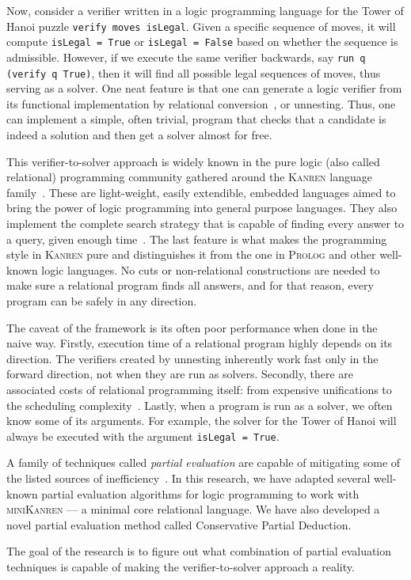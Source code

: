 Now, consider a verifier written in a logic programming language for the Tower of Hanoi puzzle \texttt{verify moves isLegal}. 
Given a specific sequence of moves, it will compute \texttt{isLegal = True} or \texttt{isLegal = False} based on whether the sequence is admissible. 
However, if we execute the same verifier backwards, say \texttt{run q (verify q True)}, then it will find all possible legal sequences of moves, thus serving as a solver. 
One neat feature is that one can generate a logic verifier from its functional implementation by relational conversion~\cite{lozov2018typed}, or unnesting. 
Thus, one can implement a simple, often trivial, program that checks that a candidate is indeed a solution and then get a solver almost for free. 

This verifier-to-solver approach is widely known in the pure logic (also called relational) programming community gathered around the \textsc{Kanren} language family~\cite{TheReasonedSchemer,byrd2017unified}. 
These are light-weight, easily extendible, embedded languages aimed to bring the power of logic programming into general purpose languages. 
They also implement the complete search strategy that is capable of finding every answer to a query, given enough time~\cite{kiselyov2005backtracking}.
The last feature is what makes the programming style in \textsc{Kanren} pure and distinguishes it from the one in \textsc{Prolog} and other well-known logic languages. 
No cuts or non-relational constructions are needed to make sure a relational program finds all answers, and for that reason, every program can be safely in any direction. 

The caveat of the framework is its often poor performance when done in the naive way. 
Firstly, execution time  of a relational program highly depends on its direction. 
The verifiers created by unnesting inherently work fast only in the forward direction, not when they are run as solvers. 
Secondly, there are associated costs of relational programming itself: from expensive unifications to the scheduling complexity~\cite{rozplokhas2022scheduling}. 
Lastly, when a program is run as a solver, we often know some of its arguments. 
For example, the solver for the Tower of Hanoi will always be executed with the argument \texttt{isLegal = True}. 

A family of techniques called \emph{partial evaluation} are capable of mitigating some of the listed sources of inefficiency~\cite{de1999conjunctive,verbitskaia2021empirical}. 
In this research, we have adapted several well-known partial evaluation algorithms for logic programming to work with \textsc{miniKanren} --- a minimal core relational language. 
We have also developed a novel partial evaluation method called Conservative Partial Deduction.

The goal of the research is to figure out what combination of partial evaluation techniques is capable of making the verifier-to-solver approach a reality. 






